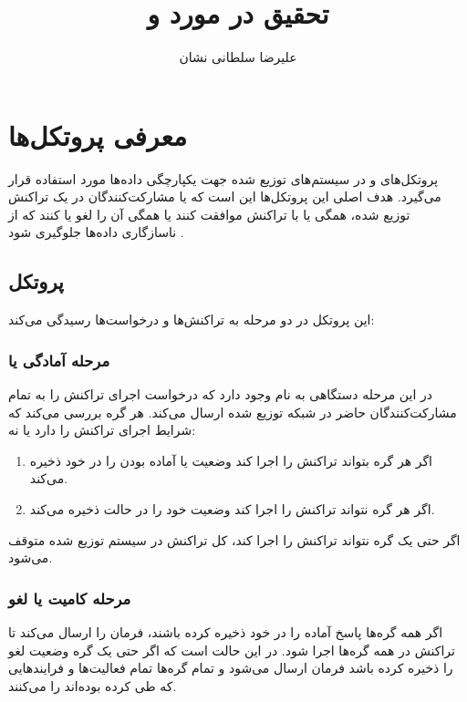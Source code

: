 \documentclass[a4paper]{article}
\title{تحقیق در مورد \lr{2 Phase Commit} و \lr{3 Phase Commit}}
\author{علیرضا سلطانی نشان}
\begin{document}
\maketitle

\section{معرفی پروتکل‌ها}

پروتکل‌های  و  در سیستم‌های توزیع شده جهت یکپارچگی داده‌ها مورد
استفاده قرار می‌گیرد. هدف اصلی این پروتکل‌ها این است که  یا
مشارکت‌کنندگان در یک تراکنش توزیع شده، همگی یا با تراکنش موافقت کنند یا همگی آن
را لغو یا  کنند که از ناسازگاری داده‌ها جلوگیری شود
\cite{npc,consensus}.

\subsection{پروتکل }

این پروتکل در دو مرحله به تراکنش‌ها و درخواست‌ها رسیدگی می‌کند:

\subsubsection{مرحله آمادگی یا }

در این مرحله دستگاهی به نام  وجود دارد که درخواست اجرای تراکنش
را به تمام مشارکت‌کنندگان حاضر در شبکه توزیع شده ارسال می‌کند. هر گره بررسی
می‌کند که شرایط اجرای تراکنش را دارد یا نه:

\begin{enumerate}
    \item اگر هر گره بتواند تراکنش را اجرا کند وضعیت  یا آماده بودن را
    در  خود ذخیره می‌کند.
    \item اگر هر گره نتواند تراکنش را اجرا کند وضعیت خود را در حالت 
    ذخیره می‌کند.
\end{enumerate}

اگر حتی یک گره نتواند تراکنش را اجرا کند، کل تراکنش در سیستم توزیع شده متوقف
می‌شود.

\subsubsection{مرحله کامیت یا لغو }

اگر همه گره‌ها پاسخ آماده را در  خود ذخیره کرده باشند،
 فرمان  را ارسال می‌کند تا تراکنش در همه گره‌ها اجرا
شود. در این حالت است که اگر حتی یک گره وضعیت لغو را ذخیره کرده باشد فرمان
 ارسال می‌شود و تمام گره‌ها تمام فعالیت‌ها و فرایند‌هایی که طی کرده
بوده‌اند را  می‌کنند.
\end{document}
